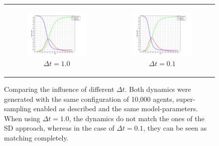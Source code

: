 \begin{figure}
\begin{center}
	\begin{tabular}{c c}
		\begin{subfigure}[b]{0.5\textwidth}
			\centering
			\includegraphics[width=.8\textwidth, angle=0]{./shared/fig/frabs/SIR_10000agents_150t_1dt_parallel.png}
			\caption{$\Delta t = 1.0$}
			\label{fig:sir_10000_1dt}
		\end{subfigure}
	
		&
		
		\begin{subfigure}[b]{0.5\textwidth}
			\centering
			\includegraphics[width=.8\textwidth, angle=0]{./shared/fig/frabs/SIR_10000agents_150t_01dt_parallel.png}
			\caption{$\Delta t = 0.1$}
			\label{fig:sir_10000_01dt}
		\end{subfigure}
	\end{tabular}
	
	\caption{Comparing the influence of different $\Delta t$. Both dynamics were generated with the same configuration of 10,000 agents, super-sampling enabled as described and the same model-parameters. When using $\Delta t = 1.0$, the dynamics do not match the ones of the SD approach, whereas in the case of $\Delta t = 0.1$, they can be seen as matching completely.} 
	\label{fig:sir_10000_dt_comparisons}
\end{center}
\end{figure}

